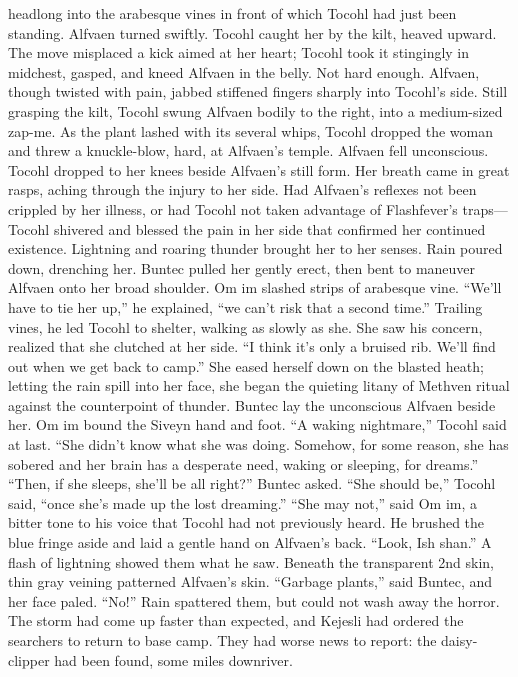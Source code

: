 \documentclass[9pt]{article}
\begin{document}
headlong into the arabesque vines in front of which Tocohl had just been standing. Alfvaen turned swiftly.
Tocohl caught her by the kilt, heaved upward. The move misplaced a kick aimed at her heart; Tocohl
took it stingingly in midchest, gasped, and kneed Alfvaen in the belly.
Not hard enough. Alfvaen, though twisted with pain, jabbed stiffened fingers sharply into Tocohl’s
side.
Still grasping the kilt, Tocohl swung Alfvaen bodily to the right, into a medium-sized zap-me. As the
plant lashed with its several whips, Tocohl dropped the woman and threw a knuckle-blow, hard, at
Alfvaen’s temple. Alfvaen fell unconscious.
Tocohl dropped to her knees beside Alfvaen’s still form. Her breath came in great rasps, aching
through the injury to her side.
Had Alfvaen’s reflexes not been crippled by her illness, or had Tocohl not taken advantage of
Flashfever’s traps—Tocohl shivered and blessed the pain in her side that confirmed her continued
existence. Lightning and roaring thunder brought her to her senses. Rain poured down, drenching her.
Buntec pulled her gently erect, then bent to maneuver Alfvaen onto her broad shoulder. Om im
slashed strips of arabesque vine. “We’ll have to tie her up,” he explained, “we can’t risk that a second
time.”
Trailing vines, he led Tocohl to shelter, walking as slowly as she. She saw his concern, realized that
she clutched at her side. “I think it’s only a bruised rib. We’ll find out when we get back to camp.” She
eased herself down on the blasted heath; letting the rain spill into her face, she began the quieting litany of
Methven ritual against the counterpoint of thunder.
Buntec lay the unconscious Alfvaen beside her. Om im bound the Siveyn hand and foot.
“A waking nightmare,” Tocohl said at last. “She didn’t know what she was doing. Somehow, for
some reason, she has sobered and her brain has a desperate need, waking or sleeping, for dreams.”
“Then, if she sleeps, she’ll be all right?” Buntec asked.
“She should be,” Tocohl said, “once she’s made up the lost dreaming.”
“She may not,” said Om im, a bitter tone to his voice that Tocohl had not previously heard. He
brushed the blue fringe aside and laid a gentle hand on Alfvaen’s back. “Look, Ish shan.”
A flash of lightning showed them what he saw. Beneath the transparent 2nd skin, thin gray veining
patterned Alfvaen’s skin.
“Garbage plants,” said Buntec, and her face paled. “No!”
Rain spattered them, but could not wash away the horror.
The storm had come up faster than expected, and Kejesli had ordered the searchers to return to
base camp. They had worse news to report: the daisy-clipper had been found, some miles downriver.
\end{document}
